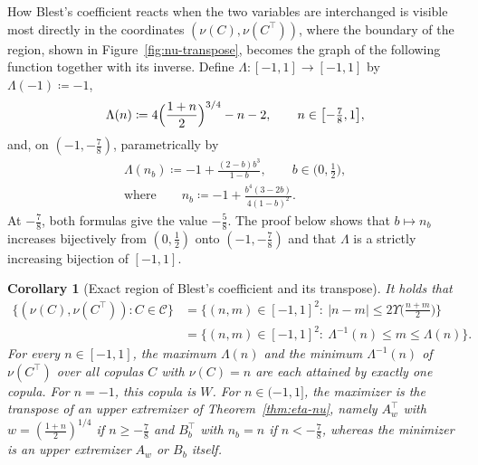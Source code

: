 \documentclass[11pt,a4paper]{article}
\newtheorem{corollary}[theorem]{Corollary}
\theoremstyle{remark}
\newcommand{\1}{\mathbf{1}}
\newcommand{\CC}{\mathcal{C}}
\begin{document}
How Blest's coefficient reacts when the two variables are interchanged is visible most directly in the coordinates $(\nu(C),\nu(C^\top))$, where the boundary of the region, shown in Figure~\ref{fig:nu-transpose}, becomes the graph of the following function together with its inverse.
Define $\Lambda:[-1,1]\to[-1,1]$ by $\Lambda(-1)\coloneqq-1$,
\begin{equation}
  \label{eq:Lambda-def}
  \Lambda(n)\coloneqq4\Bigl(\frac{1+n}{2}\Bigr)^{3/4}-n-2,
  \qquad n\in\bigl[-\tfrac78,1\bigr],
\end{equation}
and, on $(-1,-\frac78)$, parametrically by
\begin{equation}
  \label{eq:Lambda-param}
  \begin{gathered}
  \Lambda(n_b)\coloneqq-1+\frac{(2-b)b^3}{1-b},
  \qquad b\in\bigl(0,\tfrac12\bigr),\\[0.5ex]
  \text{where}\qquad
  n_b\coloneqq-1+\frac{b^4(3-2b)}{4(1-b)^2}.
  \end{gathered}
\end{equation}
At $-\frac78$, both formulas give the value $-\frac58$.
The proof below shows that $b\mapsto n_b$ increases bijectively from $(0,\frac12)$ onto $(-1,-\frac78)$ and that $\Lambda$ is a strictly increasing bijection of $[-1,1]$.

\begin{corollary}[Exact region of Blest's coefficient and its transpose]
\label{cor:nu-transpose}
It holds that
\begin{align*}
  \bigl\{(\nu(C),\nu(C^\top)):C\in\CC\bigr\}
  &=\bigl\{(n,m)\in[-1,1]^2:\ |n-m|\le2\Upsilon\bigl(\tfrac{n+m}{2}\bigr)\bigr\}\\
  &=\bigl\{(n,m)\in[-1,1]^2:\ \Lambda^{-1}(n)\le m\le\Lambda(n)\bigr\}.
\end{align*}
For every $n\in[-1,1]$, the maximum $\Lambda(n)$ and the minimum $\Lambda^{-1}(n)$ of $\nu(C^\top)$ over all copulas $C$ with $\nu(C)=n$ are each attained by exactly one copula.
For $n=-1$, this copula is $W$.
For $n\in(-1,1]$, the maximizer is the transpose of an upper extremizer of Theorem~\ref{thm:eta-nu}, namely $A_w^\top$ with $w=(\frac{1+n}{2})^{1/4}$ if $n\ge-\frac78$ and $B_b^\top$ with $n_b=n$ if $n<-\frac78$, whereas the minimizer is an upper extremizer $A_w$ or $B_b$ itself.
\end{corollary}
\end{document}
